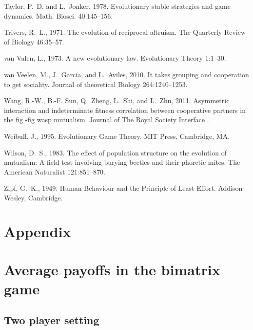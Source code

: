 \documentclass[a4paper]{scrartcl}
\begin{document}
\begin{thebibliography}{58}
Taylor, P.~D. and L.~Jonker, 1978.
\newblock Evolutionary stable strategies and game dynamics.
\newblock Math. Biosci. 40:145--156.

Trivers, R.~L., 1971.
\newblock The evolution of reciprocal altruism.
\newblock The Quarterly Review of Biology 46:35--57.

van Valen, L., 1973.
\newblock A new evolutionary law.
\newblock Evolutionary Theory 1:1--30.

van Veelen, M., J.~Garcia, and L.~Aviles, 2010.
\newblock It takes grouping and cooperation to get sociality.
\newblock Journal of theoretical Biology 264:1240--1253.

Wang, R.-W., B.-F. Sun, Q.~Zheng, L.~Shi, and L.~Zhu, 2011.
\newblock Asymmetric interaction and indeterminate fitness correlation between
  cooperative partners in the fig -fig wasp mutualism.
\newblock Journal of The Royal Society Interface .

Weibull, J., 1995.
\newblock Evolutionary Game Theory.
\newblock MIT Press, Cambridge, MA.

Wilson, D.~S., 1983.
\newblock The effect of population structure on the evolution of mutualism: A
  field test involving burying beetles and their phoretic mites.
\newblock The American Naturalist 121:851--870.

Zipf, G.~K., 1949.
\newblock Human Behaviour and the Principle of Least Effort.
\newblock Addison-Wesley, Cambridge.

\end{thebibliography}



\newpage


\section*{Appendix}
\section*{Average payoffs in the bimatrix game}
\label{appA}
\subsection*{Two player setting}
\end{document}
